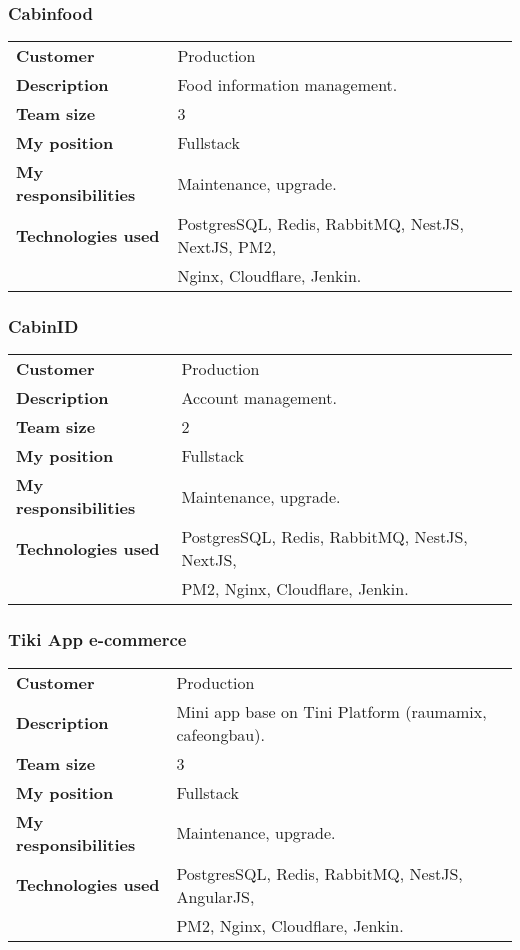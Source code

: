 \documentclass[10pt]{article} %
\begin{document}
\subsubsection*{Cabinfood}
\begin{tabular}{ll}
  \textbf{Customer} & Production \\
  \textbf{Description} & Food information management. \\
  \textbf{Team size} & 3 \\
  \textbf{My position} & Fullstack \\
  \textbf{My responsibilities} & Maintenance, upgrade. \\
  \textbf{Technologies used} & PostgresSQL, Redis, RabbitMQ, NestJS, NextJS, PM2, \\
                             & Nginx, Cloudflare, Jenkin. \\
\end{tabular}

\subsubsection*{CabinID}
\begin{tabular}{ll}
  \textbf{Customer} & Production \\
  \textbf{Description} & Account management. \\
  \textbf{Team size} & 2 \\
  \textbf{My position} & Fullstack \\
  \textbf{My responsibilities} & Maintenance, upgrade. \\
  \textbf{Technologies used} & PostgresSQL, Redis, RabbitMQ, NestJS, NextJS, \\
                             & PM2, Nginx, Cloudflare, Jenkin. \\
\end{tabular}

\subsubsection*{Tiki App e-commerce}
\begin{tabular}{ll}
  \textbf{Customer} & Production \\
  \textbf{Description} & Mini app base on Tini Platform (raumamix, cafeongbau).  \\
  \textbf{Team size} & 3 \\
  \textbf{My position} & Fullstack \\
  \textbf{My responsibilities} & Maintenance, upgrade. \\
  \textbf{Technologies used} & PostgresSQL, Redis, RabbitMQ, NestJS, AngularJS, \\
                             & PM2, Nginx, Cloudflare, Jenkin. \\
\end{tabular}
\end{document}
